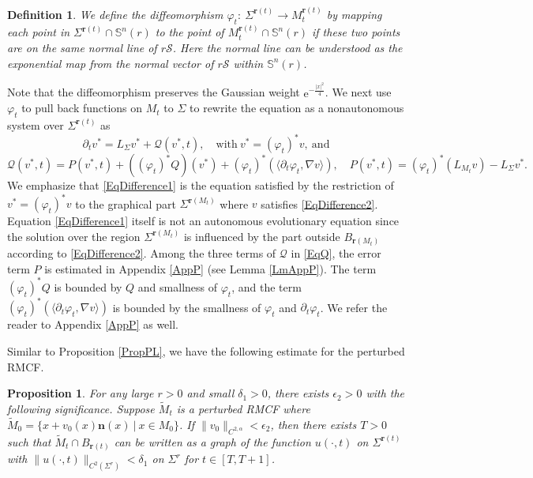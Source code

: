 \documentclass[12pt]{amsart}
\numberwithin{equation}{section}
\newtheorem{definition}[theorem]{Definition}
\newtheorem{proposition}[theorem]{Proposition}
\numberwithin{equation}{section}
\newcommand{\dt}{\delta}
\newcommand{\al}{\alpha}
\newcommand{\bn}{\mathbf{n}}
\begin{document}
	\begin{definition}\label{DefTransplant}
		We define the diffeomorphism $\varphi_t:\ \Sigma^{\mathbf r(t)}\to M_t^{\mathbf r(t)}$ by mapping each point in $\Sigma^{\mathbf r(t)}\cap  \mathbb S^n(r)$ to the point of $M_t^{\mathbf r(t)}\cap  \mathbb S^n(r)$ if these two points are on the same normal line of $r\mathcal S$. Here the normal line can be understood as the exponential map from the normal vector of $r\mathcal S$ within $\mathbb S^n(r)$.
	\end{definition}
	Note that the diffeomorphism preserves the Gaussian weight $\mathrm{e}^{-\frac{|x|^2}{4}}$. 
	We next use  $\varphi_t$ to pull back functions on $M_t$ to $\Sigma$ to rewrite the equation as a nonautonomous system over $\Sigma^{\mathbf r(t)}$ as
	\begin{equation}\label{EqDifference1}\partial_t  v^*=L_{\Sigma} v^*+\mathcal Q (v^*,t),\quad \mathrm{with}\ v^*=(\varphi_t)^*v,\ \mathrm{and}\end{equation} 
	\begin{equation}\label{EqQ}\mathcal Q(v^*,t)=P( v^*,t)+((\varphi_t)^{*}Q)(v^*)+(\varphi_t)^*(\langle \partial_t \varphi_t,\nabla v\rangle),\quad P( v^*,t)=(\varphi_t)^*(L_{M_t} v)-L_\Sigma v^*.\end{equation} We emphasize that \eqref{EqDifference1} is the equation satisfied by the restriction of $v^*=(\varphi_t)^*v$ to the graphical part $\Sigma^{\mathbf r(M_t)} $ where $v$ satisfies \eqref{EqDifference2}. Equation \eqref{EqDifference1} itself is not an autonomous evolutionary equation since the solution over the region $ \Sigma^{\mathbf r(M_t)}$ is influenced by the part outside $ B_{\mathbf r(M_t)}$ according to \eqref{EqDifference2}. Among the three terms of $\mathcal Q$ in \eqref{EqQ}, the error term $P$ is estimated in Appendix \ref{AppP} (see Lemma \ref{LmAppP}). The term $(\varphi_t)^*Q$ is bounded by $Q$ and smallness of $\varphi_t$, and the term $(\varphi_t)^*(\langle \partial_t \varphi_t,\nabla v\rangle)$ is bounded by the smallness of $\varphi_t$ and $\partial_t\varphi_t$. We refer the reader to Appendix \ref{AppP} as well.
	
	Similar to Proposition \ref{PropPL}, we have the following estimate for the perturbed RMCF. 
	
	\begin{proposition}\label{PropPL1}
		For any large $r>0$ and small $\dt_1>0$, there exists $\epsilon_2>0$ with the following significance. Suppose $\widetilde{M}_t$ is a perturbed RMCF where $\widetilde{M}_0=\{x+v_0(x)\bn(x)\ |\ x\in M_0\}$. If $\|v_0\|_{C^{2,\al}}<\epsilon_2$, then there exists $T>0$ such that $\widetilde{M}_{t}\cap B_{\mathbf{r}(t)}$ can be written as a graph of the function $u(\cdot,t)$ on $\Sigma^{\mathbf{r}(t)}$ with $\|u(\cdot,t)\|_{C^2(\Sigma^r)}<\dt_1$ on $\Sigma^r$ for $t\in[T,T+1]$.
	\end{proposition}
	
\end{document}
